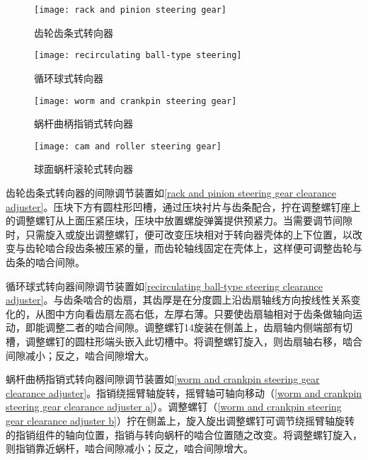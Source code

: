 \documentclass[UTF8]{ctexart}
\numberwithin{figure}{section}
\numberwithin{table}{section}
\begin{document}
\begin{figure}[htbp]
	\centering
	\begin{minipage}[b]{0.4\textwidth}
		\centering
		\texttt{[image: rack and pinion steering gear]}
		\caption{齿轮齿条式转向器}
		\label{rack and pinion steering gear}
	\end{minipage}
	\begin{minipage}[b]{0.5\textwidth}
		\centering
		\texttt{[image: recirculating ball-type steering]}
		\caption{循环球式转向器}
		\label{recirculating ball-type steering}
	\end{minipage}
	\begin{minipage}[b]{0.4\textwidth}
		\centering
		\texttt{[image: worm and crankpin steering gear]}
		\caption{蜗杆曲柄指销式转向器}
		\label{worm and crankpin steering gear}
	\end{minipage}
	\begin{minipage}[b]{0.5\textwidth}
		\centering
		\texttt{[image: cam and roller steering gear]}
		\caption{球面蜗杆滚轮式转向器}
		\label{cam and roller steering gear}
	\end{minipage}
\end{figure}

齿轮齿条式转向器的间隙调节装置如\cref{rack and pinion steering gear clearance adjuster}。压块下方有圆柱形凹槽，通过压块衬片与齿条配合，拧在调整螺钉座上的调整螺钉从上面压紧压块，压块中放置螺旋弹簧提供预紧力。当需要调节间隙时，只需旋入或旋出调整螺钉，便可改变压块相对于转向器壳体的上下位置，以改变与齿轮啮合段齿条被压紧的量，而齿轮轴线固定在壳体上，这样便可调整齿轮与齿条的啮合间隙。

循环球式转向器间隙调节装置如\cref{recirculating ball-type steering clearance adjuster}。与齿条啮合的齿扇，其齿厚是在分度圆上沿齿扇轴线方向按线性关系变化的，从图中方向看齿扇左高右低，左厚右薄。只要使齿扇轴相对于齿条做轴向运动，即能调整二者的啮合间隙。调整螺钉14旋装在侧盖上，齿扇轴内侧端部有切槽，调整螺钉的圆柱形端头嵌入此切槽中。将调整螺钉旋入，则齿扇轴右移，啮合间隙减小；反之，啮合间隙增大。

蜗杆曲柄指销式转向器间隙调节装置如\cref{worm and crankpin steering gear clearance adjuster}。指销绕摇臂轴旋转，摇臂轴可轴向移动（\cref{worm and crankpin steering gear clearance adjuster a}）。调整螺钉（\cref{worm and crankpin steering gear clearance adjuster b}）拧在侧盖上，旋入旋出调整螺钉可调节绕摇臂轴旋转的指销组件的轴向位置，指销与转向蜗杆的啮合位置随之改变。将调整螺钉旋入，则指销靠近蜗杆，啮合间隙减小；反之，啮合间隙增大。
\end{document}
